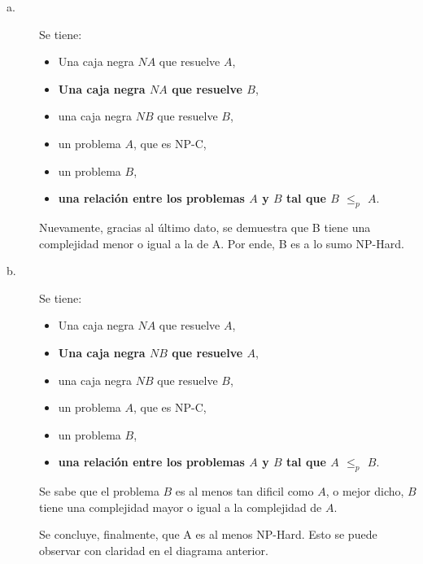 \begin{description}

    \item[a.] Se tiene:

\begin{itemize}
    \item Una caja negra $NA$ que resuelve $A$,
    \item\textbf{Una caja negra $NA$ que resuelve $B$},
    \item una caja negra $NB$ que resuelve $B$,
    \item un problema $A$, que es NP-C,
    \item un problema $B$,
    \item \textbf{una relación entre los problemas $A$ y $B$ tal que $B$ $\leq_{p}$ $A$}.
\end{itemize}

Nuevamente, gracias al último dato, se demuestra que B tiene una complejidad menor o igual a la de A. Por ende, B es a lo sumo NP-Hard.
    
\item[b.] Se tiene:

\begin{itemize}
    \item Una caja negra $NA$ que resuelve $A$,
    \item\textbf{Una caja negra $NB$ que resuelve $A$},
    \item una caja negra $NB$ que resuelve $B$,
    \item un problema $A$, que es NP-C,
    \item un problema $B$,
    \item \textbf{una relación entre los problemas $A$ y $B$ tal que $A$ $\leq_{p}$ $B$}.
\end{itemize}

Se sabe que el problema $B$ es al menos tan dificil como $A$, o mejor dicho, $B$ tiene una complejidad mayor o igual a la complejidad de $A$.

Se concluye, finalmente, que A es al menos NP-Hard. Esto se puede observar con claridad en el diagrama anterior.

    \end{description}
